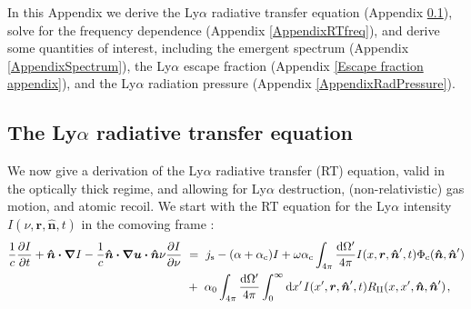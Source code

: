 \documentclass[fleqn,usenatbib]{mnras}
\begin{document}
In this Appendix we derive the Ly$\alpha$ radiative transfer equation (Appendix \ref{AppendixRTeq}), solve for the frequency dependence (Appendix \ref{AppendixRTfreq}), and derive some quantities of interest, including the emergent spectrum (Appendix \ref{AppendixSpectrum}), the Ly$\alpha$ escape fraction (Appendix \ref{Escape fraction appendix}), and the Ly$\alpha$ radiation pressure (Appendix \ref{AppendixRadPressure}).

\subsection{The Ly\texorpdfstring{\boldmath$\alpha$}{alpha} radiative transfer equation}
\label{AppendixRTeq}

We now give a derivation of the Ly$\alpha$ radiative transfer (RT) equation, valid in the optically thick regime, and allowing for Ly$\alpha$ destruction, (non-relativistic) gas motion, and atomic recoil. We start with the RT equation for the Ly$\alpha$ intensity $I(\nu, \boldsymbol{r}, \boldsymbol{\hat{n}}, t)$ in the comoving frame \citep[e.g.][]{Mihalas1975, Loeb1999, Castor2004}:
\begin{align}
    \dfrac{1}{c} \dfrac{\partial I}{\partial t} + \boldsymbol{\hat{n}} \boldsymbol{\cdot} \boldsymbol{\nabla} I - \dfrac{1}{c} \boldsymbol{\hat{n}} \boldsymbol{\cdot} \boldsymbol{\nabla} \boldsymbol{u}\boldsymbol{\cdot} \boldsymbol{\hat{n}} \nu \dfrac{\partial I}{\partial \nu} ~&=~ j_{\rm s} - (\alpha + \alpha_{\rm c}) I + \omega \alpha_{\rm c} \int_{4\pi} \dfrac{\textrm{d}\Omega'}{4 \pi} I(x, \boldsymbol{r}, \boldsymbol{\hat{n}}', t) \Phi_{\rm c} (\boldsymbol{\hat{n}}, \boldsymbol{\hat{n}}') \nonumber \\ ~&+~ \alpha_0 \int_{4\pi} \dfrac{\textrm{d}\Omega'}{4 \pi} \int_{0}^{\infty} \textrm{d}x' \hspace{1 pt}  I(x', \boldsymbol{r}, \boldsymbol{\hat{n}}', t) R_{\rm II}(x, x',\boldsymbol{\hat{n}}, \boldsymbol{\hat{n}}') \hspace{1 pt} \label{A1_LyaGeneralEq} ,
\end{align}
\end{document}
